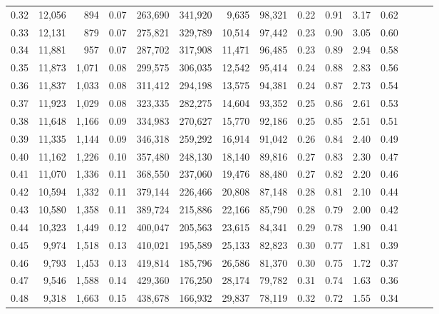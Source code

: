\begin{tabular}{rrrrrrrrrrrrrrr}
0.32 &  12,056 &    894 &  0.07 &  263,690 &  341,920 &    9,635 &   98,321 &  0.22 &  0.91 &  3.17 &      0.62 \\
0.33 &  12,131 &    879 &  0.07 &  275,821 &  329,789 &   10,514 &   97,442 &  0.23 &  0.90 &  3.05 &      0.60 \\
0.34 &  11,881 &    957 &  0.07 &  287,702 &  317,908 &   11,471 &   96,485 &  0.23 &  0.89 &  2.94 &      0.58 \\
0.35 &  11,873 &  1,071 &  0.08 &  299,575 &  306,035 &   12,542 &   95,414 &  0.24 &  0.88 &  2.83 &      0.56 \\
0.36 &  11,837 &  1,033 &  0.08 &  311,412 &  294,198 &   13,575 &   94,381 &  0.24 &  0.87 &  2.73 &      0.54 \\
0.37 &  11,923 &  1,029 &  0.08 &  323,335 &  282,275 &   14,604 &   93,352 &  0.25 &  0.86 &  2.61 &      0.53 \\
0.38 &  11,648 &  1,166 &  0.09 &  334,983 &  270,627 &   15,770 &   92,186 &  0.25 &  0.85 &  2.51 &      0.51 \\
0.39 &  11,335 &  1,144 &  0.09 &  346,318 &  259,292 &   16,914 &   91,042 &  0.26 &  0.84 &  2.40 &      0.49 \\
0.40 &  11,162 &  1,226 &  0.10 &  357,480 &  248,130 &   18,140 &   89,816 &  0.27 &  0.83 &  2.30 &      0.47 \\
0.41 &  11,070 &  1,336 &  0.11 &  368,550 &  237,060 &   19,476 &   88,480 &  0.27 &  0.82 &  2.20 &      0.46 \\
0.42 &  10,594 &  1,332 &  0.11 &  379,144 &  226,466 &   20,808 &   87,148 &  0.28 &  0.81 &  2.10 &      0.44 \\
0.43 &  10,580 &  1,358 &  0.11 &  389,724 &  215,886 &   22,166 &   85,790 &  0.28 &  0.79 &  2.00 &      0.42 \\
0.44 &  10,323 &  1,449 &  0.12 &  400,047 &  205,563 &   23,615 &   84,341 &  0.29 &  0.78 &  1.90 &      0.41 \\
0.45 &   9,974 &  1,518 &  0.13 &  410,021 &  195,589 &   25,133 &   82,823 &  0.30 &  0.77 &  1.81 &      0.39 \\
0.46 &   9,793 &  1,453 &  0.13 &  419,814 &  185,796 &   26,586 &   81,370 &  0.30 &  0.75 &  1.72 &      0.37 \\
0.47 &   9,546 &  1,588 &  0.14 &  429,360 &  176,250 &   28,174 &   79,782 &  0.31 &  0.74 &  1.63 &      0.36 \\
0.48 &   9,318 &  1,663 &  0.15 &  438,678 &  166,932 &   29,837 &   78,119 &  0.32 &  0.72 &  1.55 &      0.34 \\

\end{tabular}
